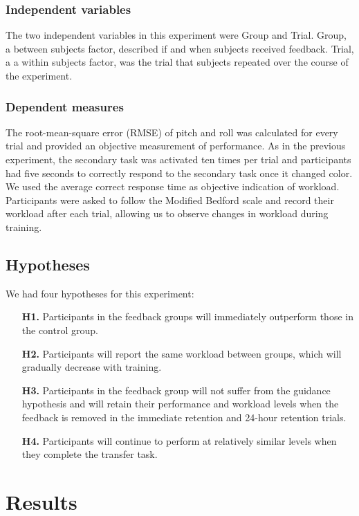 \subsubsection{Independent variables}
The two independent variables in this experiment were Group and Trial.
Group, a between subjects factor, described if and when subjects received feedback.
Trial, a a within subjects factor, was the trial that subjects repeated over the course of the experiment.

\subsubsection{Dependent measures}
The root-mean-square error (RMSE) of pitch and roll was calculated for every trial and provided an objective measurement of performance.
As in the previous experiment, the secondary task was activated ten times per trial and participants had five seconds to correctly respond to the secondary task once it changed color.
We used the average correct response time as objective indication of workload.
Participants were asked to follow the Modified Bedford scale and record their workload after each trial, allowing us to observe changes in workload during training.

\subsection{Hypotheses}
We had four hypotheses for this experiment:
\begin{itemize}
    \item[\textbf{H1.}] Participants in the feedback groups will immediately outperform those in the control group.
    \item[\textbf{H2.}] Participants will report the same workload between groups, which will gradually decrease with training.
    \item[\textbf{H3.}] Participants in the feedback group will not suffer from the guidance hypothesis and will retain their performance and workload levels when the feedback is removed in the immediate retention and 24-hour retention trials.
    \item[\textbf{H4.}] Participants will continue to perform at relatively similar levels when they complete the transfer task.
\end{itemize}

\section{Results}

